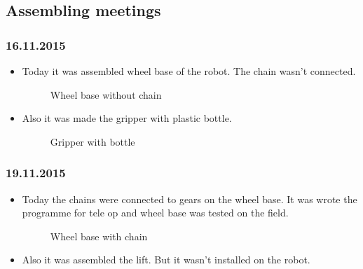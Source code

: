 \subsection{Assembling meetings}
\subsubsection{16.11.2015}
\begin{itemize}
\item Today it was assembled wheel base of the robot. The chain wasn't connected.
\begin{figure}[H]
	\begin{minipage}[h]{1\linewidth}
		\caption{Wheel base without chain}
	\end{minipage}
\end{figure} 
\item Also it was made the gripper with plastic bottle.
\begin{figure}[H]
	\begin{minipage}[h]{1\linewidth}
		\caption{Gripper with bottle}
	\end{minipage}
\end{figure}
\end{itemize}
\subsubsection{19.11.2015}
\begin{itemize}
\item Today the chains were connected to gears on the wheel base. It was wrote the programme for tele op and wheel base was tested on the field.
\begin{figure}[H]
	\begin{minipage}[h]{1\linewidth}
		\caption{Wheel base with chain}
	\end{minipage}
\end{figure} 
\item Also it was assembled the lift. But it wasn't installed on the robot.
\end{itemize}
